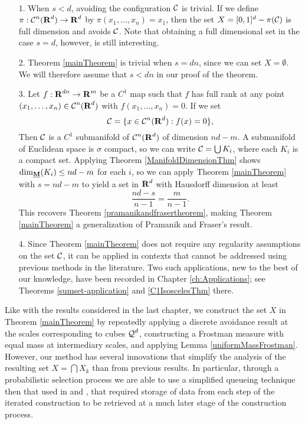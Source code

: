 \begin{remarks}
	\
	\begin{enumerate}
		\item[1.] When $s < d$, avoiding the configuration $\operatorname{\mathcal{C}}$ is trivial. If we define $\pi: \operatorname{\mathcal{C}}^n(\operatorname{\mathbf{R}}^d) \to \operatorname{\mathbf{R}}^d$ by $\pi(x_1, \dots, x_n) = x_1$, then the set $X = [0,1]^d - \pi(\operatorname{\mathcal{C}})$ is full dimension and avoids $\operatorname{\mathcal{C}}$. Note that obtaining a full dimensional set in the case $s = d$, however, is still interesting.

		\item[2.] Theorem \ref{mainTheorem} is trivial when $s = dn$, since we can set $X = \emptyset$. We will therefore assume that $s < dn$ in our proof of the theorem.

		\item[3.] Let $f: \operatorname{\mathbf{R}}^{dn} \to \operatorname{\mathbf{R}}^m$ be a $C^1$ map such that $f$ has full rank at any point $(x_1, \dots, x_n) \in \operatorname{\mathcal{C}}^n(\operatorname{\mathbf{R}}^d)$ with $f(x_1, \dots, x_n) = 0$. If we set
		\[ \operatorname{\mathcal{C}} = \{ x \in \operatorname{\mathcal{C}}^n(\operatorname{\mathbf{R}}^d) : f(x) = 0 \}, \]
		Then $\operatorname{\mathcal{C}}$ is a $C^1$ submanifold of $\operatorname{\mathcal{C}}^n(\operatorname{\mathbf{R}}^d)$ of dimension $nd - m$. A submanifold of Euclidean space is $\sigma$ compact, so we can write $\operatorname{\mathcal{C}} = \bigcup K_i$, where each $K_i$ is a compact set. Applying Theorem \ref{ManifoldDimensionThm} shows $\operatorname{\dim_{\underline{\mathbf{M}}}}(K_i) \leq nd - m$ for each $i$, so we can apply Theorem \ref{mainTheorem} with $s = nd - m$ to yield a set in $\operatorname{\mathbf{R}}^d$ with Hausdorff dimension at least
		\[ \frac{nd - s}{n-1} = \frac{m}{n-1}. \]
		This recovers Theorem \ref{pramanikandfrasertheorem}, making Theorem \ref{mainTheorem} a generalization of Pramanik and Fraser's result.

		\item[4.] Since Theorem \ref{mainTheorem} does not require any regularity assumptions on the set $\operatorname{\mathcal{C}}$, it can be applied in contexts that cannot be addressed using previous methods in the literature. Two such applications, new to the best of our knowledge, have been recorded in Chapter \ref{ch:Applications}; see Theorems \ref{sumset-application} and \ref{C1IsoscelesThm} there.
	\end{enumerate}
\end{remarks}

Like with the results considered in the last chapter, we construct the set $X$ in Theorem \ref{mainTheorem} by repeatedly applying a discrete avoidance result at the scales corresponding to cubes $\operatorname{\mathcal{Q}}^d$, constructing a Frostman measure with equal mass at intermediary scales, and applying Lemma \ref{uniformMassFrostman}. However, our method has several innovations that simplify the analysis of the resulting set $X = \bigcap X_k$ than from previous results. In particular, through a probabilistic selection process we are able to use a simplified queueing technique then that used in \cite{KeletiDimOneSet} and \cite{MalabikaRob}, that required storage of data from each step of the iterated construction to be retrieved at a much later stage of the construction process.

